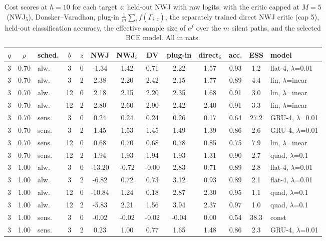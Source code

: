 \begin{table}[htbp]
\centering
\scriptsize
\caption{Cost scores at $h=10$ for each target $z$: held-out NWJ with raw logits, with the critic capped at $M=5$ (NWJ$_5$), Donsker--Varadhan, plug-in $\frac1m\sum_i f(\Gamma_{i,z})$, the separately trained direct NWJ critic (cap 5), held-out classification accuracy, the effective sample size of $e^{f}$ over the $m$ silent paths, and the selected BCE model. All in nats.}\label{tab:cost}
\begin{adjustbox}{max width=\textwidth}
\begin{tabular}{cclcc cccc c cc l}
\toprule
$q$ & $\rho$ & sched. & $b$ & $z$ & NWJ & NWJ$_5$ & DV & plug-in & direct$_5$ & acc. & ESS & model \\
\midrule
3 & 0.70 & alw. & 3 & 0 & -1.34 & 1.42 & 0.71 & 2.22 & 1.57 & 0.93 & 1.2 & flat-4, $\lambda$=0.01 \\
3 & 0.70 & alw. & 3 & 2 & 2.38 & 2.20 & 2.42 & 2.15 & 1.77 & 0.89 & 4.4 & lin, $\lambda$=inear \\
3 & 0.70 & alw. & 12 & 0 & 2.18 & 2.15 & 2.20 & 2.35 & 1.68 & 0.91 & 3.0 & lin, $\lambda$=inear \\
3 & 0.70 & alw. & 12 & 2 & 2.80 & 2.60 & 2.90 & 2.42 & 2.40 & 0.91 & 3.3 & lin, $\lambda$=inear \\
3 & 0.70 & sens. & 3 & 0 & 0.24 & 0.24 & 0.24 & 0.26 & 0.17 & 0.64 & 27.2 & GRU-4, $\lambda$=0.01 \\
3 & 0.70 & sens. & 3 & 2 & 1.45 & 1.53 & 1.45 & 1.49 & 1.39 & 0.86 & 2.6 & GRU-4, $\lambda$=0.01 \\
3 & 0.70 & sens. & 12 & 0 & 0.68 & 0.70 & 0.68 & 0.78 & 0.85 & 0.75 & 7.9 & lin, $\lambda$=inear \\
3 & 0.70 & sens. & 12 & 2 & 1.94 & 1.93 & 1.94 & 1.93 & 1.31 & 0.90 & 2.7 & quad, $\lambda$=0.1 \\
3 & 1.00 & alw. & 3 & 0 & -13.20 & -0.72 & -0.00 & 2.83 & 0.71 & 0.89 & 2.8 & flat-4, $\lambda$=0.01 \\
3 & 1.00 & alw. & 3 & 2 & -6.82 & 0.72 & 0.73 & 3.12 & 0.93 & 0.89 & 2.1 & flat-4, $\lambda$=0.01 \\
3 & 1.00 & alw. & 12 & 0 & -10.84 & 1.24 & 0.18 & 2.87 & 2.30 & 0.95 & 1.1 & quad, $\lambda$=0.1 \\
3 & 1.00 & alw. & 12 & 2 & -5.83 & 2.21 & 1.56 & 3.94 & 2.37 & 0.97 & 1.0 & quad, $\lambda$=0.1 \\
3 & 1.00 & sens. & 3 & 0 & -0.02 & -0.02 & -0.02 & -0.04 & 0.00 & 0.54 & 38.3 & const \\
3 & 1.00 & sens. & 3 & 2 & 0.23 & 1.00 & 0.77 & 1.65 & 1.48 & 0.86 & 2.3 & GRU-4, $\lambda$=0.01 \\

\end{tabular}
\end{adjustbox}
\end{table}
